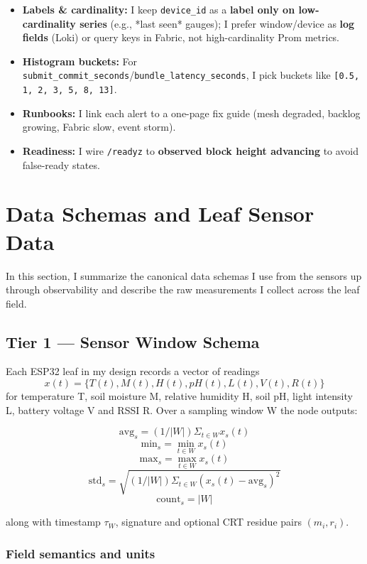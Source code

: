 \documentclass[12pt]{article}
\begin{document}
\begin{itemize}
\item \textbf{Labels \& cardinality:} I keep \texttt{device\_id} as a \textbf{label only on low-cardinality series} (e.g., *last seen* gauges); I prefer window/device as \textbf{log fields} (Loki) or query keys in Fabric, not high-cardinality Prom metrics.
\item \textbf{Histogram buckets:} For \texttt{submit\_commit\_seconds}/\texttt{bundle\_latency\_seconds}, I pick buckets like \texttt{[0.5, 1, 2, 3, 5, 8, 13]}.
\item \textbf{Runbooks:} I link each alert to a one-page fix guide (mesh degraded, backlog growing, Fabric slow, event storm).
\item \textbf{Readiness:} I wire \texttt{/readyz} to \textbf{observed block height advancing} to avoid false-ready states.
\end{itemize}

\section{Data Schemas and Leaf Sensor Data}

In this section, I summarize the canonical data schemas I use from the sensors up through observability and describe the raw measurements I collect across the leaf field.

\subsection{Tier 1 — Sensor Window Schema}
Each ESP32 leaf in my design records a vector of readings
\[
x(t) = \{ T(t), M(t), H(t), pH(t), L(t), V(t), R(t) \}
\]
for temperature T, soil moisture M, relative humidity H, soil pH, light intensity L, battery voltage V and RSSI R. Over a sampling window W the node outputs:

\[
\text{avg}_s = (1/|W|) \Sigma_{t\in W} x_s(t)
\]
\[
\text{min}_s = \min_{t\in W} x_s(t)
\]
\[
\text{max}_s = \max_{t\in W} x_s(t)
\]
\[
\text{std}_s = \sqrt{(1/|W|) \Sigma_{t\in W} (x_s(t) - \text{avg}_s)^2}
\]
\[
\text{count}_s = |W|
\]

along with timestamp \(\tau_W\), signature and optional CRT residue pairs \((m_i, r_i)\).

\subsubsection{Field semantics and units}
\end{document}
